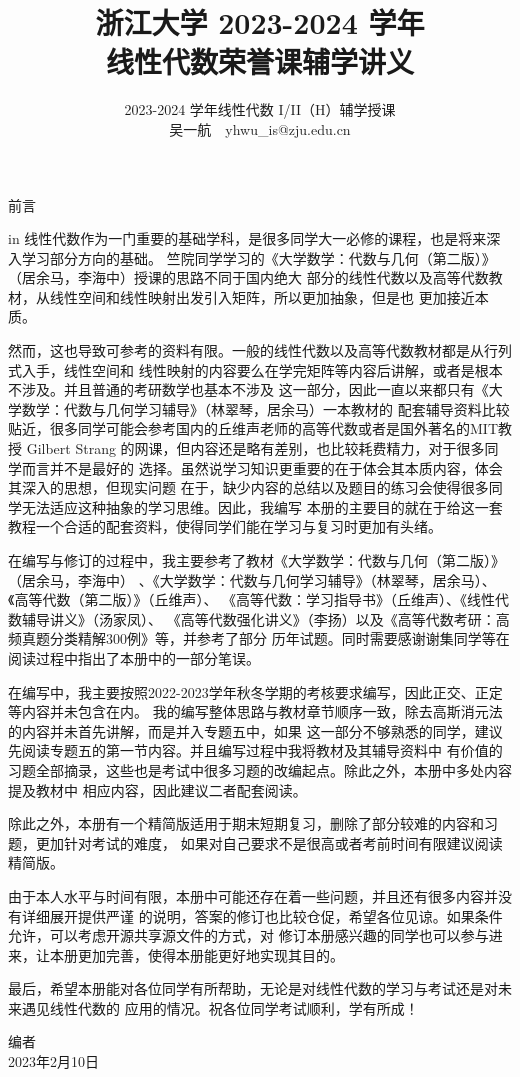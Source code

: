 \documentclass{ctexbook}
\title{\heiti 浙江大学 2023-2024 学年 \\ 线性代数荣誉课辅学讲义}
\author{2023-2024 学年线性代数 I/II（H）辅学授课 \\ 吴一航\ \ yhwu\_is@zju.edu.cn}
\begin{document}
\maketitle
\centerline{\huge \heiti 前言}
 in
\kaishu
线性代数作为一门重要的基础学科，是很多同学大一必修的课程，也是将来深入学习部分方向的基础。
竺院同学学习的《大学数学：代数与几何（第二版）》（居余马，李海中）授课的思路不同于国内绝大
部分的线性代数以及高等代数教材，从线性空间和线性映射出发引入矩阵，所以更加抽象，但是也
更加接近本质。

然而，这也导致可参考的资料有限。一般的线性代数以及高等代数教材都是从行列式入手，线性空间和
线性映射的内容要么在学完矩阵等内容后讲解，或者是根本不涉及。并且普通的考研数学也基本不涉及
这一部分，因此一直以来都只有《大学数学：代数与几何学习辅导》（林翠琴，居余马）一本教材的
配套辅导资料比较贴近，很多同学可能会参考国内的丘维声老师的高等代数或者是国外著名的MIT教授
Gilbert Strang 的网课，但内容还是略有差别，也比较耗费精力，对于很多同学而言并不是最好的
选择。虽然说学习知识更重要的在于体会其本质内容，体会其深入的思想，但现实问题
在于，缺少内容的总结以及题目的练习会使得很多同学无法适应这种抽象的学习思维。因此，我编写
本册的主要目的就在于给这一套教程一个合适的配套资料，使得同学们能在学习与复习时更加有头绪。

在编写与修订的过程中，我主要参考了教材《大学数学：代数与几何（第二版）》（居余马，李海中）
、《大学数学：代数与几何学习辅导》（林翠琴，居余马）、《高等代数（第二版）》（丘维声）、
《高等代数：学习指导书》（丘维声）、《线性代数辅导讲义》（汤家凤）、
《高等代数强化讲义》（李扬）以及《高等代数考研：高频真题分类精解300例》等，并参考了部分
历年试题。同时需要感谢谢集同学等在阅读过程中指出了本册中的一部分笔误。

在编写中，我主要按照2022-2023学年秋冬学期的考核要求编写，因此正交、正定等内容并未包含在内。
我的编写整体思路与教材章节顺序一致，除去高斯消元法的内容并未首先讲解，而是并入专题五中，如果
这一部分不够熟悉的同学，建议先阅读专题五的第一节内容。并且编写过程中我将教材及其辅导资料中
有价值的习题全部摘录，这些也是考试中很多习题的改编起点。除此之外，本册中多处内容提及教材中
相应内容，因此建议二者配套阅读。

除此之外，本册有一个精简版适用于期末短期复习，删除了部分较难的内容和习题，更加针对考试的难度，
如果对自己要求不是很高或者考前时间有限建议阅读精简版。

由于本人水平与时间有限，本册中可能还存在着一些问题，并且还有很多内容并没有详细展开提供严谨
的说明，答案的修订也比较仓促，希望各位见谅。如果条件允许，可以考虑开源共享源文件的方式，对
修订本册感兴趣的同学也可以参与进来，让本册更加完善，使得本册能更好地实现其目的。

最后，希望本册能对各位同学有所帮助，无论是对线性代数的学习与考试还是对未来遇见线性代数的
应用的情况。祝各位同学考试顺利，学有所成！

\begin{flushright}
    \songti 编者 \\
    2023年2月10日
\end{flushright}
\songti
\tableofcontents
\newpage
\setcounter{page}{1} %






\end{document}
